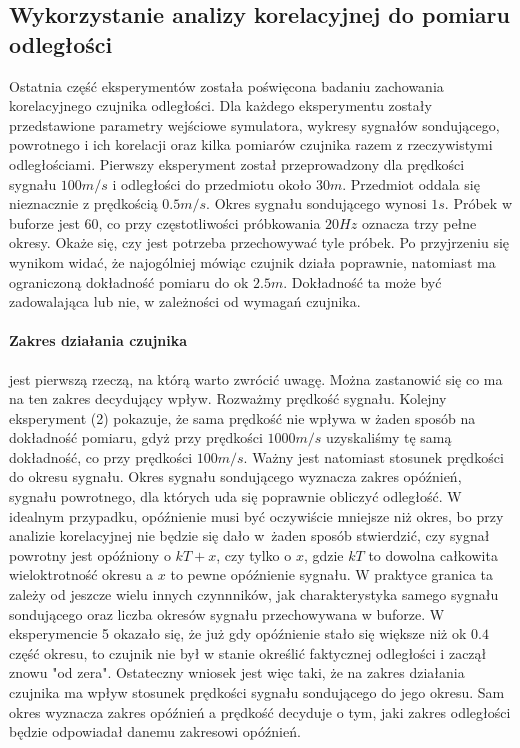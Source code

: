 \documentclass{article}
\begin{document}
    \subsection{Wykorzystanie analizy korelacyjnej do pomiaru odległości} {
        Ostatnia część eksperymentów została poświęcona badaniu zachowania
        korelacyjnego czujnika odległości. Dla każdego eksperymentu zostały
        przedstawione parametry wejściowe symulatora, wykresy sygnałów sondującego,
        powrotnego i ich korelacji oraz kilka pomiarów czujnika razem z rzeczywistymi
        odległościami. Pierwszy eksperyment został przeprowadzony dla prędkości
        sygnału $100m/s$ i odległości do przedmiotu około $30m$. Przedmiot oddala się
        nieznacznie z prędkością $0.5m/s$. Okres sygnału sondującego wynosi $1s$.
        Próbek w buforze jest $60$, co przy częstotliwości próbkowania $20Hz$ oznacza
        trzy pełne okresy. Okaże się, czy jest potrzeba przechowywać tyle próbek. Po
        przyjrzeniu się wynikom widać, że najogólniej mówiąc czujnik działa poprawnie,
        natomiast ma ograniczoną dokładność pomiaru do ok $2.5m$. Dokładność ta może
        być zadowalająca lub nie, w zależności od wymagań czujnika.

        \paragraph{Zakres działania czujnika} jest pierwszą rzeczą, na którą warto
        zwrócić uwagę. Można zastanowić się co ma na ten zakres decydujący wpływ.
        Rozważmy prędkość sygnału. Kolejny eksperyment (2) pokazuje, że sama prędkość
        nie wpływa w żaden sposób na dokładność pomiaru, gdyż przy prędkości $1000m/s$
        uzyskaliśmy tę samą dokładność, co przy prędkości $100m/s$. Ważny jest
        natomiast stosunek prędkości do okresu sygnału. Okres sygnału sondującego
        wyznacza zakres opóźnień, sygnału powrotnego, dla których uda się poprawnie
        obliczyć odległość. W idealnym przypadku, opóźnienie musi być oczywiście
        mniejsze niż okres, bo przy analizie korelacyjnej nie będzie się dało w żaden
        sposób stwierdzić, czy sygnał powrotny jest opóźniony o $kT + x$, czy tylko o
        $x$, gdzie $kT$ to dowolna całkowita wieloktrotność okresu a $x$ to pewne
        opóźnienie sygnału. W praktyce granica ta zależy od jeszcze wielu innych
        czynnników, jak charakterystyka samego sygnału sondującego oraz liczba okresów
        sygnału przechowywana w buforze. W eksperymencie 5 okazało się, że już gdy
        opóźnienie stało się większe niż ok $0.4$ część okresu, to czujnik nie był w
        stanie określić faktycznej odległości i zaczął znowu "od zera". Ostateczny
        wniosek jest więc taki, że na zakres działania czujnika ma wpływ stosunek
        prędkości sygnału sondującego do jego okresu. Sam okres wyznacza zakres
        opóźnień a prędkość decyduje o tym, jaki zakres odległości będzie odpowiadał
        danemu zakresowi opóźnień.

}
\end{document}
